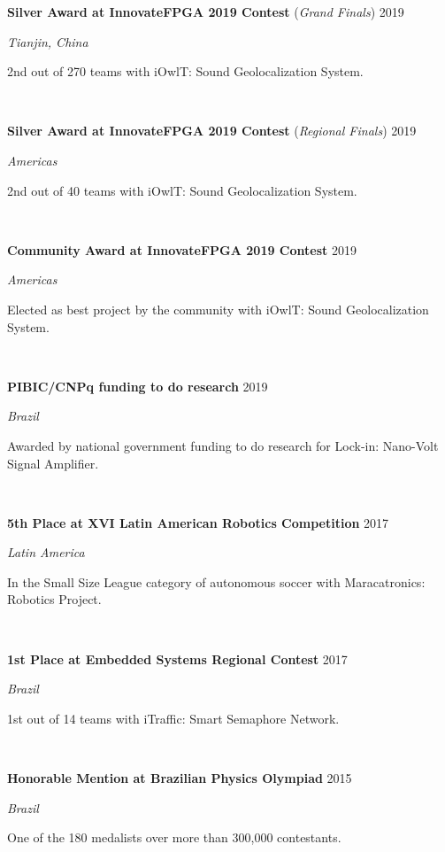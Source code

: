 \documentclass[letterpaper,10pt]{article}
\newcommand{\entry}[4]{

\begin{minipage}[t]{.15\textwidth}
\end{minipage}
\hfill\vline\hfill 
\begin{minipage}[t]{0.95\textwidth}
#2 \hfill \textsc{#1}

\textit{#3}

\footnotesize{#4}
\end{minipage}\\\vspace{.25cm}}
\newcommand{\mycomment}[1]{}
\begin{document}
\entry{2019}{\textbf{Silver Award at InnovateFPGA 2019 Contest} (\textit{Grand Finals})}{Tianjin, China}{
	2nd out of 270 teams with iOwlT: Sound Geolocalization System.
}

\entry{2019}{\textbf{Silver Award at InnovateFPGA 2019 Contest} (\textit{Regional Finals})}{Americas}{
	2nd out of 40 teams with iOwlT: Sound Geolocalization System.
}

\entry{2019}{\textbf{Community Award at InnovateFPGA 2019 Contest}}{Americas}{
	Elected as best project by the community with iOwlT: Sound Geolocalization System.
}

\entry{2019}{\textbf{PIBIC/CNPq funding to do research}}{Brazil}{
	Awarded by national government funding to do research for Lock-in: Nano-Volt Signal Amplifier.	
}

\entry{2017}{\textbf{5th Place at XVI Latin American Robotics Competition}}{Latin America}{
	In the Small Size League category of autonomous soccer with Maracatronics: Robotics Project.
}

\entry{2017}{\textbf{1st Place at Embedded Systems Regional Contest}}{Brazil}{
	1st out of 14 teams with iTraffic: Smart Semaphore Network.
}

\entry{2015}{\textbf{Honorable Mention at Brazilian Physics Olympiad}}{Brazil}{
	One of the 180 medalists over more than 300,000 contestants.
}
\vspace*{-.25cm}

\end{document}
